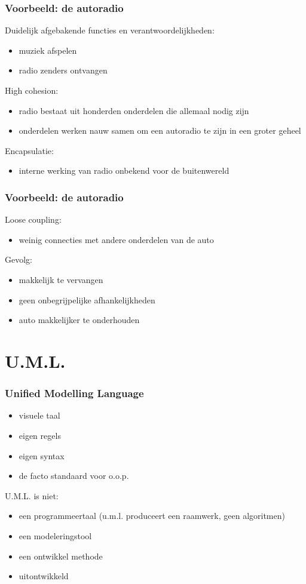 \documentclass{beamer}
\begin{document}
\begin{frame}
\frametitle{Voorbeeld: de autoradio}
 Duidelijk afgebakende functies en verantwoordelijkheden:
 \begin{itemize}
 \item muziek afspelen
 \item radio zenders ontvangen\pause
\end{itemize}
High cohesion:
\begin{itemize}
\item radio bestaat uit honderden onderdelen die allemaal nodig zijn
\item onderdelen werken nauw samen om een autoradio te zijn in een groter geheel\pause
\end{itemize}
Encapsulatie:
\begin{itemize}
\item interne werking van radio onbekend voor de buitenwereld
\end{itemize}
\end{frame}

\begin{frame}
\frametitle{Voorbeeld: de autoradio}
Loose coupling:
\begin{itemize}
\item weinig connecties met andere onderdelen van de auto
\end{itemize}
Gevolg:
\begin{itemize}
\item makkelijk te vervangen
\item geen onbegrijpelijke afhankelijkheden
\item auto makkelijker te onderhouden
\end{itemize}
\end{frame}

\section{U.M.L.}

\begin{frame}\frametitle{Unified Modelling Language}
  \begin{itemize}
  \item visuele taal
  \item eigen regels
  \item eigen syntax
  \item de facto standaard voor o.o.p.
  \end{itemize}\pause
  U.M.L. is niet:
  \begin{itemize}
  \item een programmeertaal (u.m.l. produceert een raamwerk, geen algoritmen)
  \item een modeleringstool
  \item een ontwikkel methode
  \item uitontwikkeld
  \end{itemize}
\end{frame}
\end{document}
